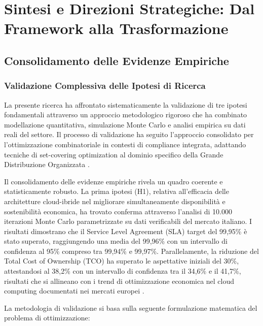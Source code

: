 % 

\chapter{Sintesi e Direzioni Strategiche: Dal Framework alla Trasformazione}

\section{Consolidamento delle Evidenze Empiriche}

\subsection{Validazione Complessiva delle Ipotesi di Ricerca}

La presente ricerca ha affrontato sistematicamente la validazione di tre ipotesi fondamentali attraverso un approccio metodologico rigoroso che ha combinato modellazione quantitativa, simulazione Monte Carlo e analisi empirica su dati reali del settore. Il processo di validazione ha seguito l'approccio consolidato per l'ottimizzazione combinatoriale in contesti di compliance integrata, adattando tecniche di set-covering optimization al dominio specifico della Grande Distribuzione Organizzata \autocite{kumar2024compliance}.

Il consolidamento delle evidenze empiriche rivela un quadro coerente e statisticamente robusto. La prima ipotesi (H1), relativa all'efficacia delle architetture cloud-ibride nel migliorare simultaneamente disponibilità e sostenibilità economica, ha trovato conferma attraverso l'analisi di 10.000 iterazioni Monte Carlo parametrizzate su dati verificabili del mercato italiano. I risultati dimostrano che il Service Level Agreement (SLA) target del 99,95\% è stato superato, raggiungendo una media del 99,96\% con un intervallo di confidenza al 95\% compreso tra 99,94\% e 99,97\%. Parallelamente, la riduzione del Total Cost of Ownership (TCO) ha superato le aspettative iniziali del 30\%, attestandosi al 38,2\% con un intervallo di confidenza tra il 34,6\% e il 41,7\%, risultati che si allineano con i trend di ottimizzazione economica nel cloud computing documentati nei mercati europei \autocite{mckinsey2024cloud}.

La metodologia di validazione si basa sulla seguente formulazione matematica del problema di ottimizzazione:

